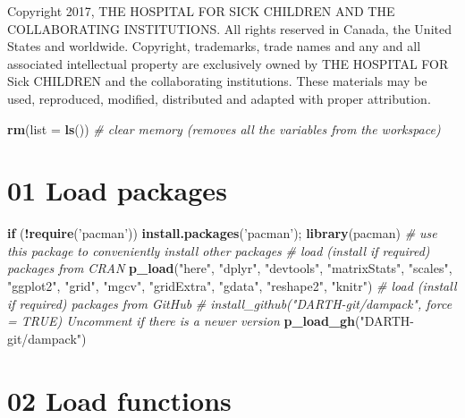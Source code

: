 \documentclass[
]{article}
\newenvironment{Shaded}{\begin{snugshade}}{\end{snugshade}}
\newcommand{\CommentTok}[1]{\textcolor[rgb]{0.56,0.35,0.01}{\textit{#1}}}
\newcommand{\ControlFlowTok}[1]{\textcolor[rgb]{0.13,0.29,0.53}{\textbf{#1}}}
\newcommand{\DataTypeTok}[1]{\textcolor[rgb]{0.13,0.29,0.53}{#1}}
\newcommand{\KeywordTok}[1]{\textcolor[rgb]{0.13,0.29,0.53}{\textbf{#1}}}
\newcommand{\NormalTok}[1]{#1}
\newcommand{\OperatorTok}[1]{\textcolor[rgb]{0.81,0.36,0.00}{\textbf{#1}}}
\newcommand{\StringTok}[1]{\textcolor[rgb]{0.31,0.60,0.02}{#1}}
\begin{document}
Copyright 2017, THE HOSPITAL FOR SICK CHILDREN AND THE COLLABORATING
INSTITUTIONS. All rights reserved in Canada, the United States and
worldwide. Copyright, trademarks, trade names and any and all associated
intellectual property are exclusively owned by THE HOSPITAL FOR Sick
CHILDREN and the collaborating institutions. These materials may be
used, reproduced, modified, distributed and adapted with proper
attribution.

\begin{Shaded}
\begin{Highlighting}[]
\KeywordTok{rm}\NormalTok{(}\DataTypeTok{list =} \KeywordTok{ls}\NormalTok{())      }\CommentTok{# clear memory (removes all the variables from the workspace)}
\end{Highlighting}
\end{Shaded}

\newpage

\hypertarget{load-packages}{%
\section{01 Load packages}\label{load-packages}}

\begin{Shaded}
\begin{Highlighting}[]
\ControlFlowTok{if}\NormalTok{ (}\OperatorTok{!}\KeywordTok{require}\NormalTok{(}\StringTok{'pacman'}\NormalTok{)) }\KeywordTok{install.packages}\NormalTok{(}\StringTok{'pacman'}\NormalTok{); }\KeywordTok{library}\NormalTok{(pacman) }\CommentTok{# use this package to conveniently install other packages}
\CommentTok{# load (install if required) packages from CRAN}
\KeywordTok{p_load}\NormalTok{(}\StringTok{"here"}\NormalTok{, }\StringTok{"dplyr"}\NormalTok{, }\StringTok{"devtools"}\NormalTok{, }\StringTok{"matrixStats"}\NormalTok{, }\StringTok{"scales"}\NormalTok{, }\StringTok{"ggplot2"}\NormalTok{, }\StringTok{"grid"}\NormalTok{, }\StringTok{"mgcv"}\NormalTok{, }\StringTok{"gridExtra"}\NormalTok{, }\StringTok{"gdata"}\NormalTok{, }\StringTok{"reshape2"}\NormalTok{, }\StringTok{"knitr"}\NormalTok{)       }
\CommentTok{# load (install if required) packages from GitHub}
\CommentTok{# install_github("DARTH-git/dampack", force = TRUE) Uncomment if there is a newer version}
\KeywordTok{p_load_gh}\NormalTok{(}\StringTok{"DARTH-git/dampack"}\NormalTok{) }
\end{Highlighting}
\end{Shaded}

\hypertarget{load-functions}{%
\section{02 Load functions}\label{load-functions}}
\end{document}
